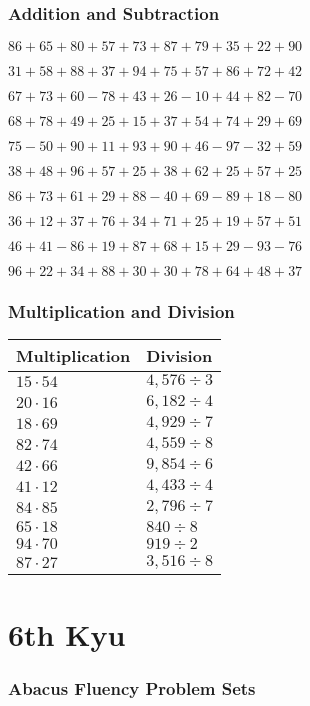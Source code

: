 \hypertarget{addition-and-subtraction-100}{%
\subsubsection{Addition and
Subtraction}\label{addition-and-subtraction-100}}

\(86+65+80+57+73+87+79+35+22+ 90\)

\(31+58+88+37+94+75+57+86+72+42\)

\(67+73+60-78+43+26-10+44+82-70\)

\(68+78+49+25+15+37+54+74+29+69\)

\(75-50+90+11+93+90+46-97-32+59\)

\(38+48+96+57+25+38+62+25+57+25\)

\(86+73+61+29+88-40+69-89+18-80\)

\(36+12+37+76+34+71+25+19+57+51\)

\(46+41-86+19+87+68+15+29-93-76\)

\(96+22+34+88+30+30+78+64+48+37\)

\hypertarget{multiplication-and-division-100}{%
\subsubsection{Multiplication and
Division}\label{multiplication-and-division-100}}

\begin{longtable}[]{@{}ll@{}}
\toprule
Multiplication & Division\tabularnewline
\midrule
\endhead
\(15\cdot54\) & \(4,576÷3\)\tabularnewline
\(20\cdot16\) & \(6,182÷4\)\tabularnewline
\(18\cdot69\) & \(4,929÷7\)\tabularnewline
\(82\cdot74\) & \(4,559÷8\)\tabularnewline
\(42\cdot66\) & \(9,854÷6\)\tabularnewline
\(41\cdot12\) & \(4,433÷4\)\tabularnewline
\(84\cdot85\) & \(2,796÷7\)\tabularnewline
\(65\cdot18\) & \(840÷8\)\tabularnewline
\(94\cdot70\) & \(919÷2\)\tabularnewline
\(87\cdot27\) & \(3,516 ÷8\)\tabularnewline
\bottomrule
\end{longtable}

\hypertarget{th-kyu-2}{%
\section{6th Kyu}\label{th-kyu-2}}

\hypertarget{abacus-fluency-problem-sets-2}{%
\subsubsection{Abacus Fluency Problem
Sets}\label{abacus-fluency-problem-sets-2}}


